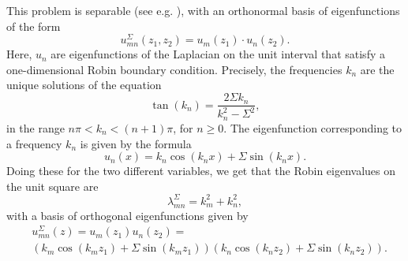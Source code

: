 \documentclass{amsart}
\theoremstyle{definition}
\theoremstyle{remark}
\renewcommand\geq\geqslant
\numberwithin{equation}{section}
\theoremstyle{definition}
\theoremstyle{remark}
\begin{document}
This problem is separable (see e.g. \cite{RudWig}), with an orthonormal basis of eigenfunctions of the form \begin{equation}
	u_{mn}^{\Sigma}(z_1,z_2)=u_m(z_1)\cdot u_n(z_2).\end{equation}
Here, $u_n$ are eigenfunctions of the Laplacian on the unit interval that satisfy a one-dimensional Robin boundary condition. Precisely, the frequencies $k_n$ are the unique solutions of the equation \begin{equation}
	\tan(k_n)=\frac{2\Sigma k_n}{k_n^2-\Sigma^2},
\end{equation}in the range $n\pi<k_n<(n+1)\pi$, for $n\geq 0$. The eigenfunction corresponding to a frequency $k_n$ is given by the formula \begin{equation}
	u_n(x)=k_n\cos\left(k_nx\right)+\Sigma\sin(k_nx). 
\end{equation}
Doing these for the two different variables, we get that the Robin eigenvalues on the unit square are
\begin{equation}
	\lambda_{mn}^\Sigma=k_m^2+k_n^2,
\end{equation}with a basis of orthogonal eigenfunctions given by\begin{equation}
	\begin{aligned}
	   & u_{mn}^{\Sigma}(z)=u_m(z_1) u_n(z_2)=\\&\left(k_m\cos\left(k_mz_1\right)+\Sigma\sin(k_mz_1)\right) \left(k_n\cos\left(k_nz_2\right)+\Sigma\sin(k_nz_2)\right).
	\end{aligned}
\end{equation}
\end{document}
